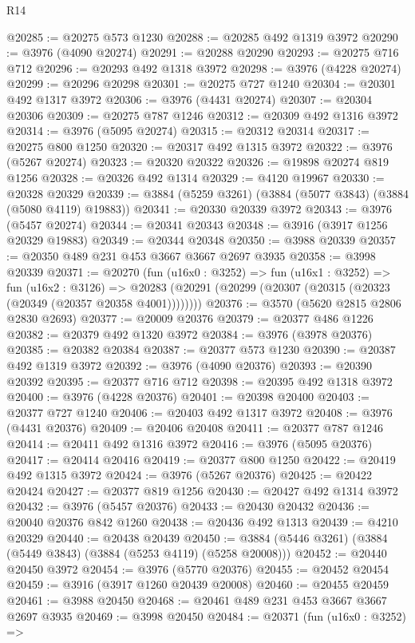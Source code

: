 \begin{lexlean}{R14}
\begin{coremodule}
@20285 := @20275 @573 @1230
@20288 := @20285 @492 @1319 @3972
@20290 := @3976 (@4090 @20274)
@20291 := @20288 @20290
@20293 := @20275 @716 @712
@20296 := @20293 @492 @1318 @3972
@20298 := @3976 (@4228 @20274)
@20299 := @20296 @20298
@20301 := @20275 @727 @1240
@20304 := @20301 @492 @1317 @3972
@20306 := @3976 (@4431 @20274)
@20307 := @20304 @20306
@20309 := @20275 @787 @1246
@20312 := @20309 @492 @1316 @3972
@20314 := @3976 (@5095 @20274)
@20315 := @20312 @20314
@20317 := @20275 @800 @1250
@20320 := @20317 @492 @1315 @3972
@20322 := @3976 (@5267 @20274)
@20323 := @20320 @20322
@20326 := @19898 @20274 @819 @1256
@20328 := @20326 @492 @1314
@20329 := @4120 @19967
@20330 := @20328 @20329
@20339 := @3884 (@5259 @3261) (@3884 (@5077 @3843) (@3884 (@5080 @4119) @19883))
@20341 := @20330 @20339 @3972
@20343 := @3976 (@5457 @20274)
@20344 := @20341 @20343
@20348 := @3916 (@3917 @1256 @20329 @19883)
@20349 := @20344 @20348
@20350 := @3988 @20339
@20357 := @20350 @489 @231 @453 @3667 @3667 @2697 @3935
@20358 := @3998 @20339
@20371 := @20270
    (fun (u16x0 : @3252) =>
    fun (u16x1 : @3252) =>
    fun (u16x2 : @3126) =>
    @20283 (@20291 (@20299 (@20307 (@20315 (@20323 (@20349 (@20357 @20358 @4001))))))))
@20376 := @3570 (@5620 @2815 @2806 @2830 @2693)
@20377 := @20009 @20376
@20379 := @20377 @486 @1226
@20382 := @20379 @492 @1320 @3972
@20384 := @3976 (@3978 @20376)
@20385 := @20382 @20384
@20387 := @20377 @573 @1230
@20390 := @20387 @492 @1319 @3972
@20392 := @3976 (@4090 @20376)
@20393 := @20390 @20392
@20395 := @20377 @716 @712
@20398 := @20395 @492 @1318 @3972
@20400 := @3976 (@4228 @20376)
@20401 := @20398 @20400
@20403 := @20377 @727 @1240
@20406 := @20403 @492 @1317 @3972
@20408 := @3976 (@4431 @20376)
@20409 := @20406 @20408
@20411 := @20377 @787 @1246
@20414 := @20411 @492 @1316 @3972
@20416 := @3976 (@5095 @20376)
@20417 := @20414 @20416
@20419 := @20377 @800 @1250
@20422 := @20419 @492 @1315 @3972
@20424 := @3976 (@5267 @20376)
@20425 := @20422 @20424
@20427 := @20377 @819 @1256
@20430 := @20427 @492 @1314 @3972
@20432 := @3976 (@5457 @20376)
@20433 := @20430 @20432
@20436 := @20040 @20376 @842 @1260
@20438 := @20436 @492 @1313
@20439 := @4210 @20329
@20440 := @20438 @20439
@20450 := @3884 (@5446 @3261) (@3884 (@5449 @3843) (@3884 (@5253 @4119) (@5258 @20008)))
@20452 := @20440 @20450 @3972
@20454 := @3976 (@5770 @20376)
@20455 := @20452 @20454
@20459 := @3916 (@3917 @1260 @20439 @20008)
@20460 := @20455 @20459
@20461 := @3988 @20450
@20468 := @20461 @489 @231 @453 @3667 @3667 @2697 @3935
@20469 := @3998 @20450
@20484 := @20371
    (fun (u16x0 : @3252) =>

\end{coremodule}
\end{lexlean}
